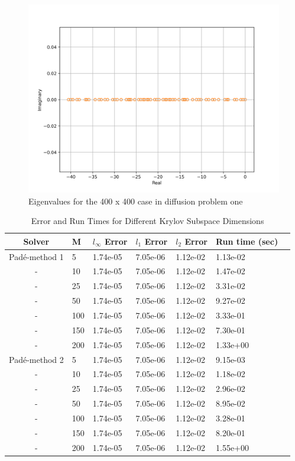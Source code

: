 \begin{figure}[p]
    \centering
    \includegraphics[width=5in]{images/chapter-5/progressionProblems/problem1/eigenvaluesDiffusion1-20.png}
    \caption{Eigenvalues for the 400 x 400 case in diffusion problem one}
    \label{fig:eigenvalues_diffusion_one}
\end{figure}

\clearpage

\begin{table}[p]
   \caption{\label{tab:diffusion_problem1_results_krylov} Error and Run Times for Different Krylov Subspace Dimensions}
   \centering
   \begin{tabular}{cllllll}
   \hline
   Solver & M & $l_{\infty}$ Error & $l_{1}$ Error & $l_{2}$ Error & Run time (sec)\\
   \hline
   Pad\'e-method 1 &   5 & 1.74e-05 & 7.05e-06 & 1.12e-02 & 1.13e-02 \\
   - &  10 & 1.74e-05 & 7.05e-06 & 1.12e-02 & 1.47e-02 \\
   - &  25 & 1.74e-05 & 7.05e-06 & 1.12e-02 & 3.31e-02 \\
   - &  50 & 1.74e-05 & 7.05e-06 & 1.12e-02 & 9.27e-02 \\
   - & 100 & 1.74e-05 & 7.05e-06 & 1.12e-02 & 3.33e-01 \\
   - & 150 & 1.74e-05 & 7.05e-06 & 1.12e-02 & 7.30e-01 \\
   - & 200 & 1.74e-05 & 7.05e-06 & 1.12e-02 & 1.33e+00 \\
   \hline
   Pad\'e-method 2 &   5 & 1.74e-05 & 7.05e-06 & 1.12e-02 & 9.15e-03 \\
   - &  10 & 1.74e-05 & 7.05e-06 & 1.12e-02 & 1.18e-02 \\
   - &  25 & 1.74e-05 & 7.05e-06 & 1.12e-02 & 2.96e-02 \\
   - &  50 & 1.74e-05 & 7.05e-06 & 1.12e-02 & 8.95e-02 \\
   - & 100 & 1.74e-05 & 7.05e-06 & 1.12e-02 & 3.28e-01 \\
   - & 150 & 1.74e-05 & 7.05e-06 & 1.12e-02 & 8.20e-01 \\
   - & 200 & 1.74e-05 & 7.05e-06 & 1.12e-02 & 1.55e+00 \\
   \hline
   \end{tabular}
\end{table}


